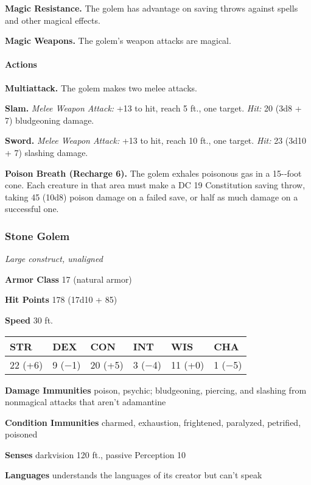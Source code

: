 \documentclass[
]{article}
\begin{document}
\textbf{Magic Resistance.} The golem has advantage on saving throws
against spells and other magical effects.

\textbf{Magic Weapons.} The golem's weapon attacks are magical.

\hypertarget{actions-18}{%
\paragraph{Actions}\label{actions-18}}

\textbf{Multiattack.} The golem makes two melee attacks.

\textbf{Slam.} \emph{Melee Weapon Attack:} +13 to hit, reach 5 ft., one
target. \emph{Hit:} 20 (3d8 + 7) bludgeoning damage.

\textbf{Sword.} \emph{Melee Weapon Attack:} +13 to hit, reach 10 ft.,
one target. \emph{Hit:} 23 (3d10 + 7) slashing damage.

\textbf{Poison Breath (Recharge 6).} The golem exhales poisonous gas in
a 15-­‐foot cone. Each creature in that area must make a DC 19
Constitution saving throw, taking 45 (10d8) poison damage on a failed
save, or half as much damage on a successful one.

\hypertarget{stone-golem}{%
\subsubsection{Stone Golem}\label{stone-golem}}

\emph{Large construct, unaligned}

\textbf{Armor Class} 17 (natural armor)

\textbf{Hit Points} 178 (17d10 + 85)

\textbf{Speed} 30 ft.

\begin{longtable}[]{@{}llllll@{}}
\toprule
STR & DEX & CON & INT & WIS & CHA\tabularnewline
\midrule
\endhead
22 (+6) & 9 (−1) & 20 (+5) & 3 (−4) & 11 (+0) & 1 (−5)\tabularnewline
\bottomrule
\end{longtable}

\textbf{Damage Immunities} poison, psychic; bludgeoning, piercing, and
slashing from nonmagical attacks that aren't adamantine

\textbf{Condition Immunities} charmed, exhaustion, frightened,
paralyzed, petrified, poisoned

\textbf{Senses} darkvision 120 ft., passive Perception 10

\textbf{Languages} understands the languages of its creator but can't
speak
\end{document}
